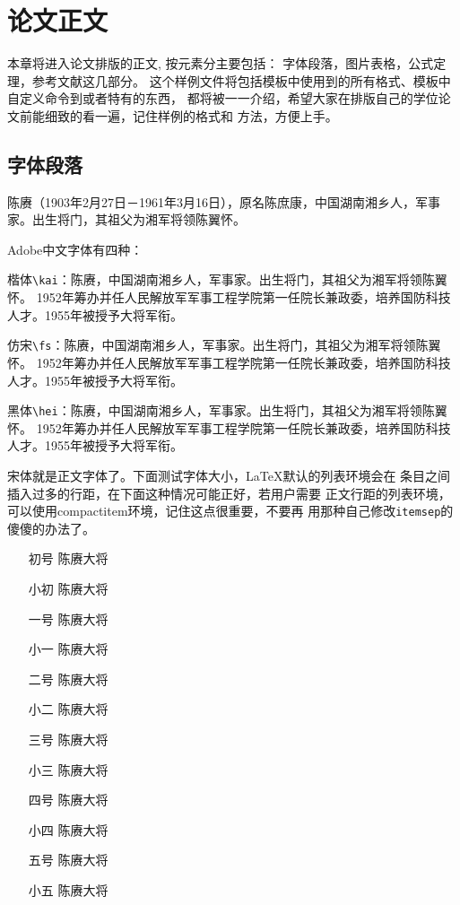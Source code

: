 \chapter{论文正文}
\label{chap:main}
本章将进入论文排版的正文, 按元素分主要包括：
{\kai 字体段落，图片表格，公式定理，参考文献}这几部分。
这个样例文件将包括模板中使用到的所有格式、模板中自定义命令到或者特有的东西，
都将被一一介绍，希望大家在排版自己的学位论文前能细致的看一遍，记住样例的格式和
方法，方便上手。

\section{字体段落}
\label{sec:font}

陈赓（1903年2月27日－1961年3月16日），原名陈庶康，中国湖南湘乡人，军事家。出生将门，其祖父为湘军将领陈翼怀。

Adobe中文字体有四种：

{\kai 楷体\verb|\kai|：陈赓，中国湖南湘乡人，军事家。出生将门，其祖父为湘军将领陈翼怀。%
1952年筹办并任人民解放军军事工程学院第一任院长兼政委，培养国防科技人才。1955年被授予大将军衔。}

{\fs 仿宋\verb|\fs|：陈赓，中国湖南湘乡人，军事家。出生将门，其祖父为湘军将领陈翼怀。%
1952年筹办并任人民解放军军事工程学院第一任院长兼政委，培养国防科技人才。1955年被授予大将军衔。}

{\hei 黑体\verb|\hei|：陈赓，中国湖南湘乡人，军事家。出生将门，其祖父为湘军将领陈翼怀。%
1952年筹办并任人民解放军军事工程学院第一任院长兼政委，培养国防科技人才。1955年被授予大将军衔。}

宋体就是正文字体了。下面测试字体大小，\LaTeX{}默认的列表环境会在
条目之间插入过多的行距，在下面这种情况可能正好，若用户需要
{\kai 正文行距}的列表环境，可以使用compactitem环境，记住这点很重要，不要再
用那种自己修改\verb|itemsep|的傻傻的办法了。
\begin{itemize}
  \item[初号] {\song\chuhao 陈赓大将}
  \item[小初] {\song\xiaochu 陈赓大将}
  \item[一号] {\song\yihao 陈赓大将}
  \item[小一] {\song\xiaoyi 陈赓大将}
  \item[二号] {\song\erhao 陈赓大将}
  \item[小二] {\song\xiaoer 陈赓大将}
  \item[三号] {\song\sanhao 陈赓大将}
  \item[小三] {\song\xiaosan 陈赓大将}
  \item[四号] {\song\sihao 陈赓大将}
  \item[小四] {\song\xiaosi 陈赓大将}
  \item[五号] {\song\wuhao 陈赓大将}
  \item[小五] {\song\xiaowu 陈赓大将}
\end{itemize}

